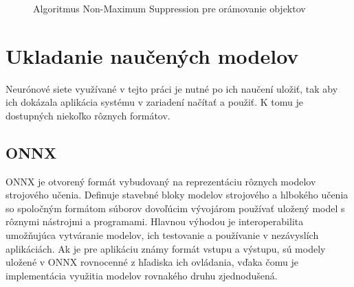 \begin{figure}[H]
                \caption{Algoritmus Non-Maximum Suppression pre orámovanie objektov}
            \end{figure}

\chapter{Ukladanie naučených modelov}
    Neurónové siete využívané v tejto práci je nutné po ich naučení uložiť, tak aby ich dokázala aplikácia systému v zariadení načítať a použiť. K tomu je dostupných niekoľko rôznych formátov.

    \section{ONNX}
        ONNX je otvorený formát vybudovaný na reprezentáciu rôznych modelov strojového učenia. Definuje stavebné bloky modelov strojového a hlbokého učenia so spoločným formátom súborov dovoľúcim vývojárom používať uložený model s rôznymi nástrojmi a programami. Hlavnou výhodou je interoperabilita umožňujúca vytváranie modelov, ich testovanie a používanie v nezávyslích aplikáciách. Ak je pre aplikáciu známy formát vstupu a výstupu, sú modely uložené v ONNX rovnocenné z hľadiska ich ovládania, vďaka čomu je implementácia využitia modelov rovnakého druhu zjednodušená.

